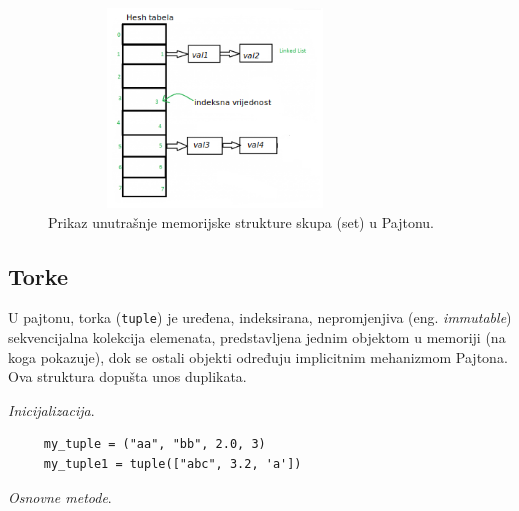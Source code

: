  	\begin{figure}[!ht]
	\centering
	\includegraphics[width=250pt,height=150pt]{slike/set_mem_organization.png}
	\caption{Prikaz unutrašnje memorijske strukture skupa (set) u Pajtonu. }
\end{figure}  %

\subsection{Torke}
 
 U pajtonu, torka (\texttt{tuple}) je uređena, indeksirana, nepromjenjiva (eng. \textit{immutable}) sekvencijalna kolekcija elemenata, predstavljena jednim objektom u memoriji (na koga pokazuje), dok se ostali objekti određuju implicitnim mehanizmom Pajtona.  Ova struktura dopušta unos duplikata. 
 
 
 \textit{Inicijalizacija}.  
 
 \begin{verbatim}
 	 my_tuple = ("aa", "bb", 2.0, 3)
 	 my_tuple1 = tuple(["abc", 3.2, 'a'])
 \end{verbatim}
 
 
 \textit{Osnovne metode}. 
 
